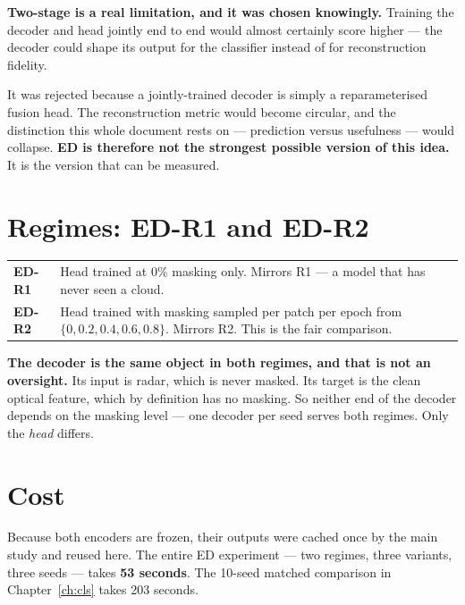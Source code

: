\documentclass[11pt,a4paper]{report}
\begin{document}
\begin{flagbox}
\textbf{Two-stage is a real limitation, and it was chosen knowingly.}
Training the decoder and head jointly end to end would almost certainly score
higher --- the decoder could shape its output for the classifier instead of for
reconstruction fidelity.

\medskip
It was rejected because a jointly-trained decoder is simply a reparameterised
fusion head. The reconstruction metric would become circular, and the
distinction this whole document rests on --- prediction versus usefulness ---
would collapse. \textbf{ED is therefore not the strongest possible version of
this idea.} It is the version that can be measured.
\end{flagbox}

\section{Regimes: ED-R1 and ED-R2}

\begin{center}
\small
\begin{tabular}{@{}lp{10.5cm}@{}}
\toprule
\textbf{ED-R1} & Head trained at 0\% masking only. Mirrors R1 --- a model that
has never seen a cloud. \\
\textbf{ED-R2} & Head trained with masking sampled per patch per epoch from
$\{0, 0.2, 0.4, 0.6, 0.8\}$. Mirrors R2. This is the fair comparison. \\
\bottomrule
\end{tabular}
\end{center}

\begin{intuition}
\textbf{The decoder is the same object in both regimes, and that is not an
oversight.} Its input is radar, which is never masked. Its target is the clean
optical feature, which by definition has no masking. So neither end of the
decoder depends on the masking level --- one decoder per seed serves both
regimes. Only the \emph{head} differs.
\end{intuition}

\section{Cost}

Because both encoders are frozen, their outputs were cached once by the main
study and reused here. The entire ED experiment --- two regimes, three variants,
three seeds --- takes \textbf{53 seconds}. The 10-seed matched comparison in
Chapter~\ref{ch:cls} takes 203 seconds.
\end{document}
